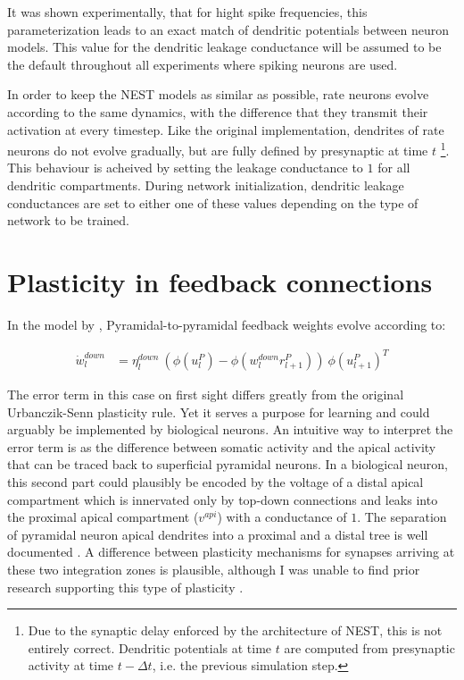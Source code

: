 It was shown experimentally, that for hight spike frequencies, this parameterization leads to an exact match of
dendritic potentials between neuron models. This value for the dendritic leakage conductance will be assumed to be the
default throughout all experiments where spiking neurons are used. \newline

In order to keep the NEST models as similar as possible, rate neurons evolve according to the same dynamics, with the
difference that they transmit their activation at every timestep. Like the original implementation, dendrites of rate
neurons do not evolve gradually, but are fully defined by presynaptic at time $t$ \footnote{Due to the synaptic delay
    enforced by the architecture of NEST, this is not entirely correct. Dendritic potentials at time $t$ are computed from
    presynaptic activity at time $t- \Delta t$, i.e. the previous simulation step.}. This behaviour is acheived by setting
the leakage conductance to $1$ for all dendritic compartments. During network initialization, dendritic leakage
conductances are set to either one of these values depending on the type of network to be trained.


\section{Plasticity in feedback connections}\label{sec-feedback-plast}

In the model by \cite{sacramento2018dendritic}, Pyramidal-to-pyramidal feedback weights evolve according to: 

\begin{align}
    \dot{w}_{l}^{down} & = \eta_l^{down} \ ( \phi(u_l^{P}) - \phi(w_l^{down} r_{l+1}^P) )\ \phi(u_{l+1}^{P})^T
\end{align}

The error term in this case on first sight differs greatly from the original Urbanczik-Senn plasticity rule. Yet it 
serves a purpose for learning and could arguably be implemented by biological neurons. An intuitive way to interpret the error
term is as the difference between somatic activity and the apical activity that can be traced back to superficial 
pyramidal neurons. In a biological neuron, this second part could plausibly be encoded by the voltage of a distal
apical compartment which is innervated only by top-down connections and leaks into the proximal apical compartment
($v^{api}$) with a conductance of $1$. The separation of pyramidal neuron apical dendrites into a proximal and a distal
tree is well documented \citeme. A difference between plasticity mechanisms for synapses arriving at these two 
integration zones is plausible, although I was unable to find prior research supporting this type of plasticity \citeme.
\newline

